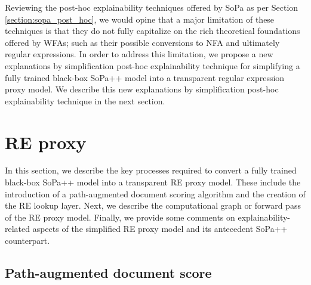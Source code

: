 Reviewing the post-hoc explainability techniques offered by SoPa as per Section
\ref{section:sopa_post_hoc}, we would opine that a major limitation of these
techniques is that they do not fully capitalize on the rich theoretical
foundations offered by WFAs; such as their possible conversions to NFA and
ultimately regular expressions. In order to address this limitation, we propose
a new explanations by simplification post-hoc explainability technique for
simplifying a fully trained black-box SoPa++ model into a transparent regular
expression proxy model. We describe this new explanations by simplification
post-hoc explainability technique in the next section.

\section{RE proxy}

In this section, we describe the key processes required to convert a
fully trained black-box SoPa++ model into a transparent RE proxy model. These include
the introduction of a path-augmented document scoring algorithm and the creation
of the RE lookup layer. Next, we describe the computational graph or forward
pass of the RE proxy model. Finally, we provide some comments on
explainability-related aspects of the simplified RE proxy model and its
antecedent SoPa++ counterpart.

\subsection{Path-augmented document score}

